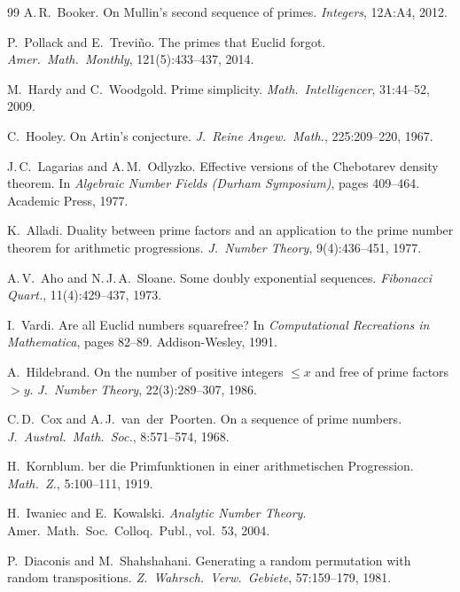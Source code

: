 \begin{thebibliography}{99}
A.\,R.~Booker.
\newblock On {M}ullin's second sequence of primes.
\newblock \emph{Integers}, 12A:A4, 2012.

P.~Pollack and E.~Trevi{\~n}o.
\newblock The primes that {E}uclid forgot.
\newblock \emph{Amer.\ Math.\ Monthly}, 121(5):433--437, 2014.

M.~Hardy and C.~Woodgold.
\newblock Prime simplicity.
\newblock \emph{Math.\ Intelligencer}, 31:44--52, 2009.

C.~Hooley.
\newblock On {A}rtin's conjecture.
\newblock \emph{J.\ Reine Angew.\ Math.}, 225:209--220, 1967.

J.\,C.~Lagarias and A.\,M.~Odlyzko.
\newblock Effective versions of the {C}hebotarev density theorem.
\newblock In \emph{Algebraic Number Fields ({D}urham Symposium)},
  pages 409--464. Academic Press, 1977.

K.~Alladi.
\newblock Duality between prime factors and an application to the prime
  number theorem for arithmetic progressions.
\newblock \emph{J.\ Number Theory}, 9(4):436--451, 1977.

A.\,V.~Aho and N.\,J.\,A.~Sloane.
\newblock Some doubly exponential sequences.
\newblock \emph{Fibonacci Quart.}, 11(4):429--437, 1973.

I.~Vardi.
\newblock Are all {E}uclid numbers squarefree?
\newblock In \emph{Computational Recreations in Mathematica}, pages 82--89.
  Addison-Wesley, 1991.

A.~Hildebrand.
\newblock On the number of positive integers $\leq x$ and free of
  prime factors $> y$.
\newblock \emph{J.\ Number Theory}, 22(3):289--307, 1986.

C.\,D.~Cox and A.\,J.~van~der~Poorten.
\newblock On a sequence of prime numbers.
\newblock \emph{J.\ Austral.\ Math.\ Soc.}, 8:571--574, 1968.

H.~Kornblum.
ber die {P}rimfunktionen in einer arithmetischen
  {P}rogression.
\newblock \emph{Math.\ Z.}, 5:100--111, 1919.

H.~Iwaniec and E.~Kowalski.
\newblock \emph{Analytic Number Theory}.
\newblock Amer.\ Math.\ Soc.\ Colloq.\ Publ., vol.~53, 2004.

P.~Diaconis and M.~Shahshahani.
\newblock Generating a random permutation with random transpositions.
\newblock \emph{Z.\ Wahrsch.\ Verw.\ Gebiete}, 57:159--179, 1981.


\end{thebibliography}
